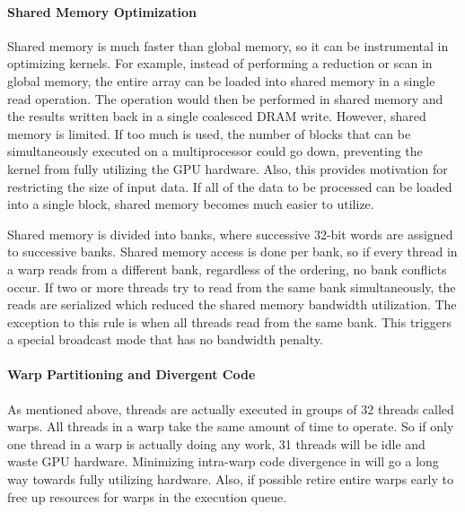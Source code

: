 \paragraph{Shared Memory Optimization}
Shared memory is much faster than global memory, so it can be instrumental in optimizing kernels. For example, instead of performing a reduction or scan in global memory, the entire array can be loaded into shared memory in a single read operation. The operation would then be performed in shared memory and the results written back in a single coalesced DRAM write. However, shared memory is limited. If too much is used, the number of blocks that can be simultaneously executed on a multiprocessor could go down, preventing the kernel from fully utilizing the GPU hardware. Also, this provides motivation for restricting the size of input data. If all of the data to be processed can be loaded into a single block, shared memory becomes much easier to utilize.\par
Shared memory is divided into banks, where successive 32-bit words are assigned to successive banks. Shared memory access is done per bank, so if every thread in a warp reads from a different bank, regardless of the ordering, no bank conflicts occur. If two or more threads try to read from the same bank simultaneously, the reads are serialized which reduced the shared memory bandwidth utilization. The exception to this rule is when all threads read from the same bank. This triggers a special broadcast mode that has no bandwidth penalty.
\paragraph{Warp Partitioning and Divergent Code}
As mentioned above, threads are actually executed in groups of 32 threads called warps. All threads in a warp take the same amount of time to operate. So if only one thread in a warp is actually doing any work, 31 threads will be idle and waste GPU hardware. Minimizing intra-warp code divergence in will go a long way towards fully utilizing hardware. Also, if possible retire entire warps early to free up resources for warps in the execution queue.
